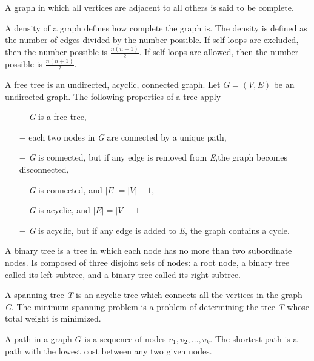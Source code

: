 	\newpage
	\begin{definition}
	A graph in which all vertices are adjacent to all others is said to be complete. 
	\end{definition}
	\begin{definition}
	A density of a graph defines how complete the graph is. The density is defined as the number of edges divided by the number possible.
	If self-loops are excluded, then the number possible is $\frac{n(n-1)}{2}$. If self-loops are allowed, then the number possible is $\frac{n(n+1)}{2}$.	
	\end{definition}
\begin{definition}
A free tree is an undirected, acyclic, connected graph. Let $G = (V,E)$ be an undirected graph. The following properties of a tree apply \\
\begin{itemize}
	\item[$-$] \textit{G} is a free tree,
	\item[$-$] each two nodes in \textit{G} are connected by a unique path,
	\item[$-$] \textit{G} is connected, but if any edge is removed from \textit{E},the graph becomes disconnected,
	\item[$-$] \textit{G} is connected, and $|E| = |V| - 1$,
	\item[$-$] \textit{G} is acyclic, and $|E| = |V| - 1$
	\item[$-$] \textit{G} is acyclic, but if any edge is added to \textit{E}, the graph contains a cycle. 
	\end{itemize}
\end{definition}
\begin{definition}
A binary tree is a tree in which each node has no more than two subordinate nodes. Is composed of three disjoint sets of nodes: a root node, a binary tree called its left subtree, and a binary tree called its right subtree.
\end{definition}
\begin{definition}
A spanning tree \textit{T} is an acyclic tree which connects all the vertices in the graph \textit{G}. The minimum-spanning problem is a problem of determining the tree \textit{T} whose total weight is minimized.
\end{definition}
\begin{definition}
A path in a graph $G$ is a sequence of nodes $v_1, v_2,\ldots,v_k$. The shortest path is a path with the lowest cost between any two given nodes.
\end{definition}
